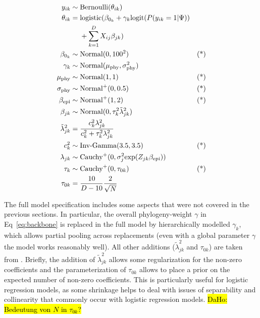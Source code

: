 \documentclass{bioinfo}
\begin{document}
\begin{methods}
\begin{equation}
  \label{eq:full}
  \begin{aligned}
   y_{ik} &\sim \text{Bernoulli}(\theta_{ik}) &\\
   \theta_{ik} &=
        \text{logistic}(\beta_{0_{k}} + \gamma_{k}\text{logit}(P(y_{ik}=1|\Psi)) & \\
        \hspace{-6cm} &~~~~ +\sum_{k=1}^{D}X_{ij}\beta_{jk}) & \\
    \beta_{0_{k}} &\sim \text{Normal}(0, 100^2) & \text{(*)}\\
   \gamma_{k} &\sim \text{Normal}(\mu_{\text{phy}}, \sigma_{\text{phy}}^2) & \\
    \mu_{\text{phy}} &\sim \text{Normal}(1, 1) & \text{(*)} \\
   \sigma_{\text{phy}} &\sim \text{Normal}^{+}(0, 0.5) & \text{(*)} \\
   \beta_{\text{epi}} &\sim \text{Normal}^{+}(1, 2) & \text{(*)} \\
   \beta_{jk} &\sim \text{Normal}(0, \tau_{k}^{2}\tilde{\lambda}^{2}_{jk}) & \\
   \tilde{\lambda}^{2}_{jk} &= \frac{c_{k}^{2}\lambda_{jk}^{2}}{c_{k}^{2} + \tau_{k}^{2}\lambda_{jk}^{2}} & \\
    c_{k}^2 &\sim \text{Inv-Gamma}(3.5, 3.5) & \text{(*)} \\
   \lambda_{jk} &\sim \text{Cauchy}^{+}(0, \sigma_{j}^2\text{exp}(Z_{jk}\beta_{\text{epi}})) & \\
   \tau_{k} &\sim \text{Cauchy}^{+}(0, \tau_{0k}) & \text{(*)} \\
   \tau_{0k} &= \frac{10}{D-10}\frac{2}{\sqrt{N}} & \\
  \end{aligned}
\end{equation}

The full model specification includes some aspects that were not covered in the previous sections. In particular, the overall phylogeny-weight $\gamma$ in Eq~\ref{eq:backbone} is replaced in the full model by  hierarchically modelled  \(\gamma_{k}\), which allows partial pooling across replacements (even with a global parameter \(\gamma\) the model works reasonably well). All other additions (\(\tilde{\lambda}_{jk}^{2}\) and \(\tau_{0k}\)) are taken from \citet{Piironen2017}. Briefly, the addition of  \(\tilde{\lambda}_{jk}^{2}\) allows some regularization for the non-zero coefficients and the parameterization of \(\tau_{0k}\) allows to place a prior on the expected number of non-zero coefficients.  This is particularly useful for logistic regression models, as some shrinkage helps to deal with issues of separability and collinearity that commonly occur with logistic regression models. \hl{DaHo: Bedeutung von $N$ in $\tau_{0k}$?}


\end{methods}
\end{document}
